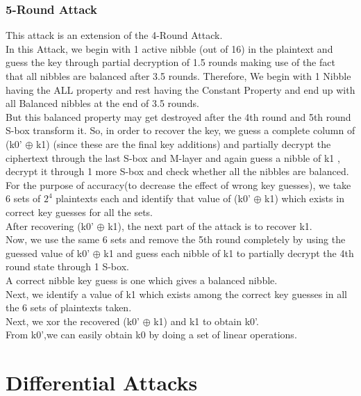 \documentclass{transcrypto}
\begin{document}
\subsubsection{5-Round Attack}
This attack is  an extension of the 4-Round Attack. \\ 
In this Attack, we begin with 1 active nibble (out of 16) in the plaintext and guess the key through partial decryption of 1.5 rounds making use of the fact that all nibbles are balanced after 3.5 rounds. 
Therefore, We begin with 1 Nibble having the ALL property and rest having the Constant Property and end up with all Balanced nibbles at the end of 3.5 rounds.  \\
But this balanced property may get destroyed after the 4th round and 5th round S-box transform it. So, in order to recover the key, we guess a complete column of (k0' $\oplus$ k1) (since these are the final key additions) and partially decrypt the ciphertext through the last S-box and M-layer and again guess a nibble of k1 , decrypt it through 1 more S-box and check whether all the nibbles are balanced. \\
For the purpose of accuracy(to decrease the effect of wrong key guesses), we take 6 sets of $2^4$ plaintexts each and identify that value of (k0' $\oplus$ k1) which exists in correct key guesses for all  the sets. \\
After recovering (k0' $\oplus$ k1), the next part of the attack is to recover k1.\\
Now, we use the same 6 sets and remove the  5th round completely by using the guessed value of k0' $\oplus$ k1 and guess each nibble of k1 to partially decrypt the 4th round state through 1 S-box.    \\
A correct nibble key guess is one which gives a balanced nibble. \\
Next, we identify a value of k1 which exists among the correct key guesses in all the 6 sets of plaintexts taken. \\
Next, we xor the recovered (k0' $\oplus$ k1) and k1 to obtain k0'.\\
From k0',we can easily obtain k0 by doing a set of linear operations. \\ 
\section{Differential Attacks}
\end{document}
